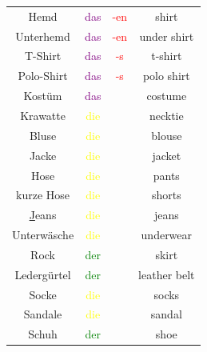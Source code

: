 \begin{center}
\begin{longtable} {|c|c|c|c|}
        Hemd                   & \textcolor{purple}{das} & \textcolor{red}{-en}                    & shirt         \\
        Unterhemd              & \textcolor{purple}{das} & \textcolor{red}{-en}                    & under shirt   \\
        T-Shirt                & \textcolor{purple}{das} & \textcolor{red}{-s}                     & t-shirt       \\
        Polo-Shirt             & \textcolor{purple}{das} & \textcolor{red}{-s}                     & polo shirt    \\
        Kostüm                 & \textcolor{purple}{das} &                                         & costume       \\
        Krawatte               & \textcolor{yellow}{die} &                                         & necktie       \\
        Bluse                  & \textcolor{yellow}{die} &                                         & blouse        \\
        Jacke                  & \textcolor{yellow}{die} &                                         & jacket        \\
        \hline
        Hose                   & \textcolor{yellow}{die} &                                         & pants         \\
        kurze Hose             & \textcolor{yellow}{die} &                                         & shorts        \\
        \underline{J}eans      & \textcolor{yellow}{die} &                                         & jeans         \\
        Unterwäsche            & \textcolor{yellow}{die} &                                         & underwear     \\
        Rock                   & \textcolor{green}{der}  &                                         & skirt         \\
        Ledergürtel            & \textcolor{green}{der}  &                                         & leather belt  \\
        \hline
        Socke                  & \textcolor{yellow}{die} &                                         & socks         \\
        Sandale                & \textcolor{yellow}{die} &                                         & sandal        \\
        Schuh                  & \textcolor{green}{der}  &                                         & shoe          \\

\end{longtable}
\end{center}
